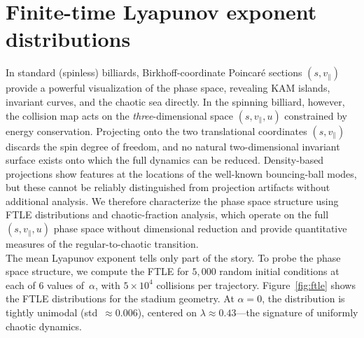 \documentclass[aps,prd,twocolumn,superscriptaddress,nofootinbib,floatfix]{revtex4-2}
\begin{document}
\section{Finite-time Lyapunov exponent distributions}
\label{sec:ftle}
\noindent
In standard (spinless) billiards, Birkhoff-coordinate Poincar\'{e} sections $(s, v_\parallel)$ provide a powerful visualization of the phase space, revealing KAM islands, invariant curves, and the chaotic sea directly. In the spinning billiard, however, the collision map acts on the \emph{three}-dimensional space $(s, v_\parallel, u)$ constrained by energy conservation. Projecting onto the two translational coordinates $(s, v_\parallel)$ discards the spin degree of freedom, and no natural two-dimensional invariant surface exists onto which the full dynamics can be reduced. Density-based projections show features at the locations of the well-known bouncing-ball modes, but these cannot be reliably distinguished from projection artifacts without additional analysis.  We therefore characterize the phase space structure using FTLE distributions and chaotic-fraction analysis, which operate on the full $(s, v_\parallel, u)$ phase space without dimensional reduction and provide quantitative measures of the regular-to-chaotic transition.\\

\noindent
The mean Lyapunov exponent tells only part of the story. To probe the phase space structure, we compute the FTLE for $5{,}000$ random initial conditions at each of 6 values of~$\alpha$, with $5\times 10^4$ collisions per trajectory. Figure~\ref{fig:ftle} shows the FTLE distributions for the stadium geometry. At $\alpha=0$, the distribution is tightly unimodal (std~$\approx 0.006$), centered on $\lambda \approx 0.43$---the signature of uniformly chaotic dynamics.\\
\end{document}
